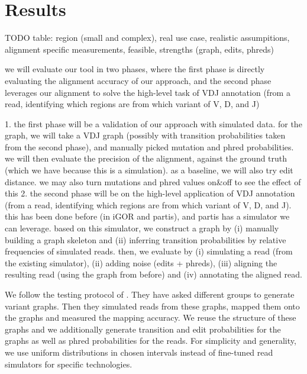 \section{Results}

TODO table: region (small and complex), real use case, realistic assumpitions, alignment specific measurements, feasible, strengths (graph, edits, phreds)

we will evaluate our tool in two phases, where the first phase is directly evaluating the alignment accuracy of our approach, and the second phase leverages our alignment to solve the high-level task of VDJ annotation (from a read, identifying which regions are from which variant of V, D, and J)

1. the first phase will be a validation of our approach with simulated data. for the graph, we will take a VDJ graph (possibly with transition probabilities taken from the second phase), and manually picked mutation and phred probabilities. we will then evaluate the precision of the alignment, against the ground truth (which we have because this is a simulation). as a baseline, we will also try edit distance. we may also turn mutations and phred values on\&off to see the effect of this
2. the second phase will be on the high-level application of VDJ annotation (from a read, identifying which regions are from which variant of V, D, and J). this has been done before (in iGOR and partis), and partis has a simulator we can leverage. based on this simulator, we construct a graph by (i) manually building a graph skeleton and (ii) inferring transition probabilities by relative frequencies of simulated reads. then, we evaluate by (i) simulating a read (from the existing simulator), (ii) adding noise (edits + phreds), (iii) aligning the resulting read (using the graph from before) and (iv) annotating the aligned read.

We follow the testing protocol of \cite{garrison2017sequence}.
They have asked different groups to generate variant graphs.
Then they simulated reads from these graphs, mapped them onto the graphs and measured the mapping accuracy.
We reuse the structure of these graphs and we additionally generate transition and edit probabilities for the graphs as well as phred probabilities for the reads.
For simplicity and generality, we use uniform distributions in chosen intervals instead of fine-tuned read simulators for specific technologies.

